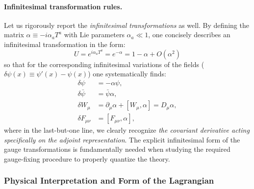 \paragraph{Infinitesimal transformation rules.}
Let us rigorously report the \textit{infinitesimal transformations} as well. By defining the matrix \(\alpha \equiv -i\alpha_a T^a\) with Lie parameters \(\alpha_a \ll 1\), one concisely describes an infinitesimal transformation in the form:
\begin{equation} \label{eq:infinitesimal_U}
    U = e^{i\alpha_a T^a} = e^{-\alpha} = 1 - \alpha + O(\alpha^2)
\end{equation}
so that for the corresponding infinitesimal variations of the fields (\(\delta\psi(x) \equiv \psi'(x) - \psi(x)\)) one systematically finds:
\begin{equation} \label{eq:infinitesimal_variations}
    \begin{aligned}
        \delta\psi        & = -\alpha\psi,                                        \\
        \delta\bar{\psi}  & = \bar{\psi}\alpha,                                   \\
        \delta W_\mu      & = \partial_\mu\alpha + [W_\mu, \alpha] = D_\mu\alpha, \\
        \delta F_{\mu\nu} & = [F_{\mu\nu}, \alpha],
    \end{aligned}
\end{equation}
where in the last-but-one line, we clearly recognize \textit{the covariant derivative acting specifically on the adjoint representation}. The explicit infinitesimal form of the gauge transformations is fundamentally needed when studying the required gauge-fixing procedure to properly quantize the theory.

\subsubsection{Physical Interpretation and Form of the Lagrangian}

